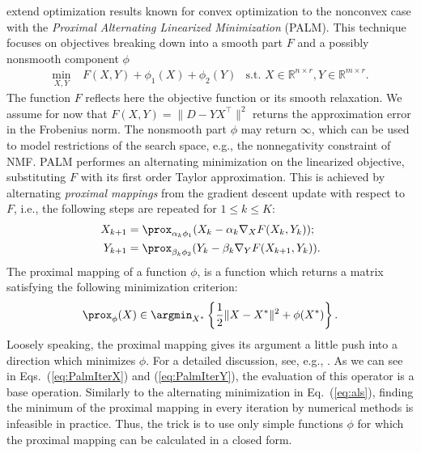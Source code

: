\cite{bolte2014proximal} extend optimization results known for convex optimization to the nonconvex case with the \emph{Proximal Alternating Linearized Minimization} (PALM). This technique focuses on objectives breaking down into a smooth part $F$ and a possibly nonsmooth component $\phi$
\begin{align}\label{eq:PalmObj}
 \min_{X,Y}&\	F(X,Y)+ \phi_1(X) +\phi_2(Y) &\text{s.t. }X\in\mathbb{R}^{n\times r}, Y\in\mathbb{R}^{m\times r}.
\end{align}
The function $F$ reflects here the objective function or its smooth relaxation. We assume for now that $F(X,Y)=\bigl\lVert D-YX^\top\bigr\rVert ^2$ returns the approximation error in the Frobenius norm. 
The nonsmooth part $\phi$ may return $\infty$, which can be used to model restrictions of the search space, e.g., the nonnegativity constraint of NMF. 
PALM performes an alternating minimization on the linearized objective, substituting $F$ with its first order Taylor approximation. This is achieved by alternating \emph{proximal mappings} from the gradient descent update with respect to $F$, i.e., the following steps are repeated for $1\leq k \leq K$:
\begin{align}\label{eq:PalmIterX}
X_{k+1} &= \prox_{\alpha_k\phi_1}(X_k-\alpha_k\nabla_XF(X_k,Y_k));\\
Y_{k+1} &= \prox_{\beta_k\phi_2}(Y_k-\beta_k\nabla_YF(X_{k+1},Y_k)).\label{eq:PalmIterY}
\end{align}
The proximal mapping of a function $\phi$, is a function which returns a matrix satisfying the following minimization criterion: 
\begin{align}\label{eq:prox}
    \prox_\phi(X) \in \argmin_{X^*}\left\{\frac{1}{2}\lVert X-X^*\rVert ^2+\phi(X^*)\right\}.
\end{align}
Loosely speaking, the proximal mapping gives its argument a little push into a direction which minimizes $\phi$. For a detailed discussion, see, e.g., \citep{parikh2014proximal}. As we can see in Eqs.~(\ref{eq:PalmIterX}) and (\ref{eq:PalmIterY}), the evaluation of this operator is a base operation. Similarly to the alternating minimization in Eq.~(\ref{eq:als}), finding the minimum of the proximal mapping in every iteration by numerical methods is infeasible in practice. Thus, the trick is to use only simple functions $\phi$ for which the proximal mapping can be calculated in a closed form. 

